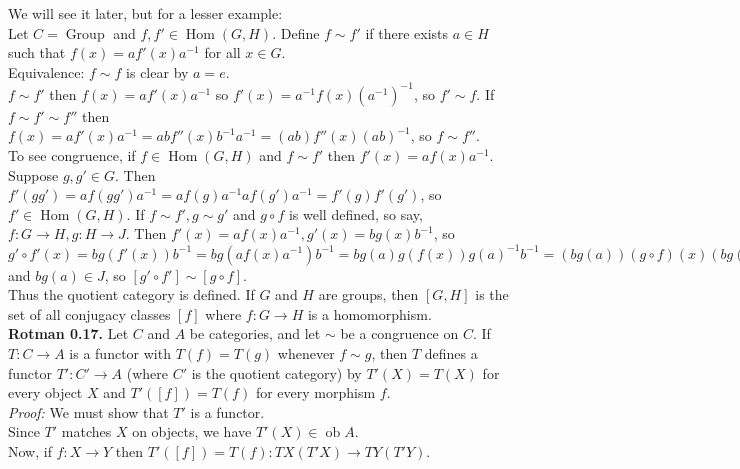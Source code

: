 \documentclass[a4paper]{article}
\theoremstyle{plain}%
\theoremstyle{definition}
\theoremstyle{remark}
\DeclareMathOperator{\ob}{ob}
\DeclareMathOperator{\Hom}{Hom}
\DeclareMathOperator{\Group}{Group}
\begin{document}
We will see it later, but for a lesser example:\\
\linebreak
Let $C = \Group$ and $f,f' \in \Hom(G,H)$. Define
$f \sim f'$ if there exists $a \in H$ such that
$f(x) = a f'(x) a^{-1}$ for all $x \in G$.\\
\linebreak
Equivalence: $f \sim f$ is clear by $a = e$.\\
$f \sim f'$ then $f(x) = a f'(x) a^{-1}$ so
$f'(x) = a^{-1} f(x) \left( a^{-1} \right)^{-1}$, so
$f' \sim f$. If
$f \sim f' \sim f''$ then
$f(x) = a f'(x) a^{-1} = 
a b f''(x) b^{-1} a^{-1}
= (ab) f''(x) (ab)^{-1}$, so
$f \sim f''$.\\
\linebreak
To see congruence, 
if $f \in \Hom(G,H)$ and
$f \sim f'$ then
$f'(x) = a f(x) a^{-1}$. Suppose
$g, g' \in G$. Then
$f'(g g') = a f( g g') a^{-1}
= a f(g) a^{-1} a f(g') a^{-1}
= f'(g) f'(g')$, so
$f' \in \Hom(G,H)$. If
$f \sim f', g \sim g'$ and  $g \circ f$ is well defined, so say,
$f  \colon G \to H, g  \colon H \to J$. Then
$f'(x) = af(x) a^{-1}, g'(x) = bg(x)b^{-1}$, so
$g' \circ f' (x)
= b g(f'(x)) b^{-1}
= b g \left( a f(x) a^{-1} \right) b^{-1}
= b g(a) g(f(x)) g(a)^{-1} b^{-1}
= (bg(a)) (g \circ f)(x) (bg(a))^{-1}$ and
$b g(a) \in J$, so
$\left[ g' \circ f' \right] \sim \left[ g \circ f \right] $.\\
\linebreak
Thus the quotient category is defined. If
$G$ and $H$ are groups, then $\left[ G , H \right] $ is the set of all 
conjugacy classes $\left[ f \right] $ where
$f  \colon G \to H$ is a homomorphism.\\
\linebreak
\textbf{Rotman 0.17.} Let $C$ and $A$ be categories, and let
$\sim$ be a congruence on $C$. If
$T  \colon C \to A$ is a functor with $T(f) = T(g)$ whenever
$f \sim g$, then $T$ defines a functor $T'  \colon C' \to A$ 
(where $C'$ is the quotient category) by
$T'(X) = T(X)$ for every object $X$ and
$T'\left( \left[ f \right]  \right) 
= T(f)$ for every morphism $f$.\\
\linebreak
\textit{Proof:} We must show that $T'$ is a functor.\\
Since $T'$ matches $X$ on objects, we have
$T'(X) \in \ob A$.\\
Now, if $f  \colon X \to Y$ then
$T'\left( \left[ f \right]  \right) = 
T \left( f \right)   \colon TX (T'X) \to TY (T'Y)$.\\
\end{document}
